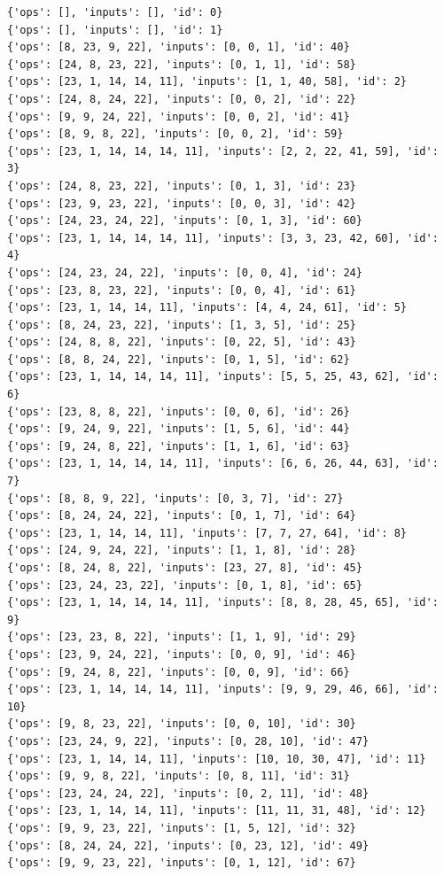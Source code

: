 \documentclass{article}
\begin{document}
\begin{verbatim}
{'ops': [], 'inputs': [], 'id': 0}
{'ops': [], 'inputs': [], 'id': 1}
{'ops': [8, 23, 9, 22], 'inputs': [0, 0, 1], 'id': 40}
{'ops': [24, 8, 23, 22], 'inputs': [0, 1, 1], 'id': 58}
{'ops': [23, 1, 14, 14, 11], 'inputs': [1, 1, 40, 58], 'id': 2}
{'ops': [24, 8, 24, 22], 'inputs': [0, 0, 2], 'id': 22}
{'ops': [9, 9, 24, 22], 'inputs': [0, 0, 2], 'id': 41}
{'ops': [8, 9, 8, 22], 'inputs': [0, 0, 2], 'id': 59}
{'ops': [23, 1, 14, 14, 14, 11], 'inputs': [2, 2, 22, 41, 59], 'id': 3}
{'ops': [24, 8, 23, 22], 'inputs': [0, 1, 3], 'id': 23}
{'ops': [23, 9, 23, 22], 'inputs': [0, 0, 3], 'id': 42}
{'ops': [24, 23, 24, 22], 'inputs': [0, 1, 3], 'id': 60}
{'ops': [23, 1, 14, 14, 14, 11], 'inputs': [3, 3, 23, 42, 60], 'id': 4}
{'ops': [24, 23, 24, 22], 'inputs': [0, 0, 4], 'id': 24}
{'ops': [23, 8, 23, 22], 'inputs': [0, 0, 4], 'id': 61}
{'ops': [23, 1, 14, 14, 11], 'inputs': [4, 4, 24, 61], 'id': 5}
{'ops': [8, 24, 23, 22], 'inputs': [1, 3, 5], 'id': 25}
{'ops': [24, 8, 8, 22], 'inputs': [0, 22, 5], 'id': 43}
{'ops': [8, 8, 24, 22], 'inputs': [0, 1, 5], 'id': 62}
{'ops': [23, 1, 14, 14, 14, 11], 'inputs': [5, 5, 25, 43, 62], 'id': 6}
{'ops': [23, 8, 8, 22], 'inputs': [0, 0, 6], 'id': 26}
{'ops': [9, 24, 9, 22], 'inputs': [1, 5, 6], 'id': 44}
{'ops': [9, 24, 8, 22], 'inputs': [1, 1, 6], 'id': 63}
{'ops': [23, 1, 14, 14, 14, 11], 'inputs': [6, 6, 26, 44, 63], 'id': 7}
{'ops': [8, 8, 9, 22], 'inputs': [0, 3, 7], 'id': 27}
{'ops': [8, 24, 24, 22], 'inputs': [0, 1, 7], 'id': 64}
{'ops': [23, 1, 14, 14, 11], 'inputs': [7, 7, 27, 64], 'id': 8}
{'ops': [24, 9, 24, 22], 'inputs': [1, 1, 8], 'id': 28}
{'ops': [8, 24, 8, 22], 'inputs': [23, 27, 8], 'id': 45}
{'ops': [23, 24, 23, 22], 'inputs': [0, 1, 8], 'id': 65}
{'ops': [23, 1, 14, 14, 14, 11], 'inputs': [8, 8, 28, 45, 65], 'id': 9}
{'ops': [23, 23, 8, 22], 'inputs': [1, 1, 9], 'id': 29}
{'ops': [23, 9, 24, 22], 'inputs': [0, 0, 9], 'id': 46}
{'ops': [9, 24, 8, 22], 'inputs': [0, 0, 9], 'id': 66}
{'ops': [23, 1, 14, 14, 14, 11], 'inputs': [9, 9, 29, 46, 66], 'id': 10}
{'ops': [9, 8, 23, 22], 'inputs': [0, 0, 10], 'id': 30}
{'ops': [23, 24, 9, 22], 'inputs': [0, 28, 10], 'id': 47}
{'ops': [23, 1, 14, 14, 11], 'inputs': [10, 10, 30, 47], 'id': 11}
{'ops': [9, 9, 8, 22], 'inputs': [0, 8, 11], 'id': 31}
{'ops': [23, 24, 24, 22], 'inputs': [0, 2, 11], 'id': 48}
{'ops': [23, 1, 14, 14, 11], 'inputs': [11, 11, 31, 48], 'id': 12}
{'ops': [9, 9, 23, 22], 'inputs': [1, 5, 12], 'id': 32}
{'ops': [8, 24, 24, 22], 'inputs': [0, 23, 12], 'id': 49}
{'ops': [9, 9, 23, 22], 'inputs': [0, 1, 12], 'id': 67}

\end{verbatim}
\end{document}
